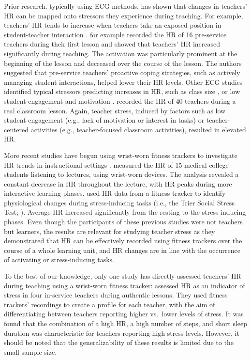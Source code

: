 \documentclass[preprint,
3p]{elsarticle} %
\begin{document}
Prior research, typically using ECG methods, has shown that changes in
teachers' HR can be mapped onto stressors they experience during
teaching. For example, teachers' HR tends to increase when teachers take
an exposed position in student-teacher interaction
\citep{sperka1995, scheuch1997psychophysische, donker2018, junker2021}.
\citet{sperka1995} for example recorded the HR of 16 pre-service
teachers during their first lesson and showed that teachers' HR
increased significantly during teaching. The activation was particularly
prominent at the beginning of the lesson and decreased over the course
of the lesson. The authors suggested that pre-service teachers'
proactive coping strategies, such as actively managing student
interactions, helped lower their HR levels. Other ECG studies identified
typical stressors predicting increases in HR, such as class size
\citep{huang2022class}, or low student engagement and motivation
\citep{junker2021}. \citet{junker2021} recorded the HR of 40 teachers
during a real classroom lesson. Again, teacher stress, induced by
factors such as low student engagement (e.g., lack of motivation or
interest in tasks) or teacher-centered activities (e.g., teacher-focused
classroom activities), resulted in elevated HR.

More recent studies have begun using wrist-worn fitness trackers to
investigate HR trends in instructional settings
\citep{Darnell2019, chalmers2021}. \citet{Darnell2019} measured the HR
of 15 medical college students listening to lectures, using wrist-worn
devices. The analysis revealed a constant decrease in HR throughout the
lecture, with HR peaks during more interactive learning phases.
\citet{chalmers2021} used HR data from a fitness tracker to identify
physiological changes during stress-inducing tasks (i.e., the Trier
Social Stress Test; \citet{kirschbaum1993trier}). Average HR increased
significantly from the resting to the stress inducing phases. Even
though the participants of these previous studies
\citep{Darnell2019, chalmers2021} were not teachers but learners, the
results are relevant for studying teacher stress as they demonstrated
that HR can be effectively recorded using fitness trackers over the
course of a whole learning unit, and HR changes are in line with the
occurrence of activating or stress-inducing tasks.

To the best of our knowledge, only one study has directly assessed
teachers' HR during teaching using a wrist-worn fitness tracker:
\citet{runge2020} assessed HR as an indicator of stress in four
in-service teachers during authentic lessons. They used fitness
trackers' recordings to create a profile for each teacher, with the aim
of differentiating between teachers reporting higher vs.~lower levels of
stress. It was found that the combination of a high HR, a high number of
steps, and short sleep duration was characteristic for teachers
reporting high stress levels. However, it should be noted that the
generalizability of these results is limited due to the small sample
size.
\end{document}
